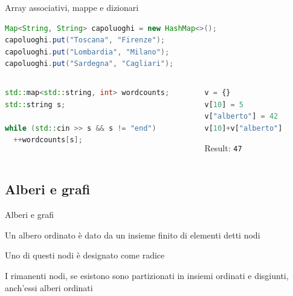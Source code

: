 \begin{frame}[fragile, shrink=5]{Array associativi, mappe e dizionari}

\small
\vspace{-6pt}
\begin{myboxtitle}[Java]
\begin{lstlisting}[language=java]  
Map<String, String> capoluoghi = new HashMap<>();
capoluoghi.put("Toscana", "Firenze");
capoluoghi.put("Lombardia", "Milano");
capoluoghi.put("Sardegna", "Cagliari");
\end{lstlisting}
\end{myboxtitle}

\vspace{-6pt}
\begin{columns}
\begin{column}{0.62\textwidth}
\begin{myboxtitle}[C++]
\begin{lstlisting}[language=c++]  
std::map<std::string, int> wordcounts;
std::string s;

while (std::cin >> s && s != "end")
  ++wordcounts[s];
\end{lstlisting}
\end{myboxtitle}
\end{column}
\begin{column}{0.34\textwidth}
\begin{myboxtitle}[Python]
\begin{lstlisting}[language=python]  
v = {} 
v[10] = 5 
v["alberto"] = 42 
v[10]+v["alberto"] 
\end{lstlisting}
\alert{Result}: \texttt{47}
\end{myboxtitle}
\end{column}
\end{columns}


\end{frame}

\subsection{Alberi e grafi}

\begin{frame}{Alberi e grafi}

\begin{myboxtitle}
\BI
\item Un \alert{albero ordinato} è dato da un insieme finito di elementi detti \alert{nodi}
\item Uno di questi nodi è designato come \alert{radice}
\item I rimanenti nodi, se esistono sono partizionati in insiemi \alert{ordinati}
e \alert{disgiunti}, anch'essi alberi ordinati
\EI
\end{myboxtitle}

  

\end{frame}

